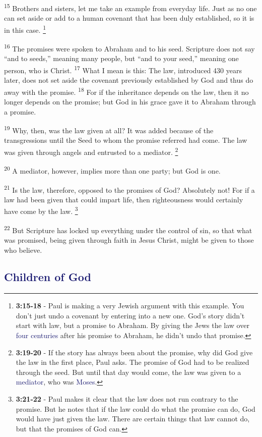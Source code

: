 \documentclass[12pt,twoside]{article}
\newcommand{\vs}[1]{\textsuperscript{#1}}
\newcommand{\vnote}[2]{%
  \begingroup
  \renewcommand\thefootnote{}%
  \footnote{\scriptsize \textbf{}#2}%
  \addtocounter{footnote}{-1}%
  \endgroup
}
\begin{document}
 \hspace{0.5cm} \vs{15} Brothers and sisters, let me take an example from everyday life. Just as no one can set aside or add to a human covenant that has been duly established, so it is in this case.\vnote{15}{\textbf{3:15-18} - Paul is making a very Jewish argument with this example. You don't just undo a covenant by entering into a new one. God's story didn't start with law, but a promise to Abraham. By giving the Jews the law over \textcolor{MidnightBlue}{four centuries} after his promise to Abraham, he didn't undo that promise.}
 \vs{16} The promises were spoken to Abraham and to his seed. Scripture does not say ``and to seeds,'' meaning many people, but ``and to your seed,'' meaning one person, who is Christ.
 \vs{17} What I mean is this: The law, introduced 430 years later, does not set aside the covenant previously established by God and thus do away with the promise.
 \vs{18} For if the inheritance depends on the law, then it no longer depends on the promise; but God in his grace gave it to Abraham through a promise.

 \vs{19} Why, then, was the law given at all? It was added because of the transgressions until the Seed to whom the promise referred had come. The law was given through angels and entrusted to a mediator.\vnote{19}{\textbf{3:19-20} - If the story has always been about the promise, why did God give the law in the first place, Paul asks. The promise of God had to be realized through the seed. But until that day would come, the law was given to a \textcolor{MidnightBlue}{mediator}, who was \textcolor{MidnightBlue}{Moses}.}
 \vs{20} A mediator, however, implies more than one party; but God is one.

 \vs{21} Is the law, therefore, opposed to the promises of God? Absolutely not! For if a law had been given that could impart life, then righteousness would certainly have come by the law.\vnote{21}{\textbf{3:21-22} - Paul makes it clear that the law does not run contrary to the promise. But he notes that if the law could do what the promise can do, God would have just given the law. There are certain things that law cannot do, but that the promises of God can.}
 \vs{22} But Scripture has locked up everything under the control of sin, so that what was promised, being given through faith in Jesus Christ, might be given to those who believe.

 \subsection*{\textcolor{MidnightBlue}{\textbf{Children of God}}}
\end{document}
